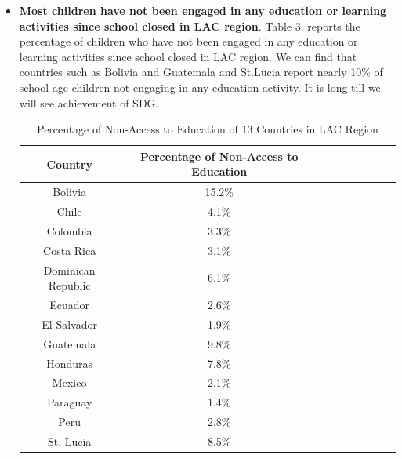 \documentclass{article}
\begin{document}
\begin{itemize}
\item \textbf{Most children have not been engaged in any education or learning activities since school closed in LAC region}. Table 3. reports the percentage of children who have not been engaged in any education or learning activities since school closed in LAC region. We can find that countries such as Bolivia and Guatemala and St.Lucia report nearly 10\% of school age children not engaging in any education activity. It is long till we will see achievement of SDG.

\begin{table}[]
\setlength{\belowcaptionskip}{0.2cm}
\label{Tab:2}
\caption{Percentage of Non-Access to Education of 13 Countries in LAC Region}
\centering
\begin{tabular}{ccccccccc}
\hline
Country      & Percentage of Non-Access to Education\\ \hline
Bolivia          & 15.2\%    \\ 
Chile          & 4.1\%    \\
Colombia          & 3.3\%    \\
Costa Rica          & 3.1\%    \\
Dominican Republic          & 6.1\%    \\
Ecuador          & 2.6\%    \\
El Salvador          & 1.9\%    \\
Guatemala          & 9.8\%    \\
Honduras          & 7.8\%    \\
Mexico          & 2.1\%    \\
Paraguay          & 1.4\%    \\
Peru          & 2.8\%    \\
St. Lucia          & 8.5\%    \\  \hline
\end{tabular}
\end{table}

\end{itemize}
\end{document}
